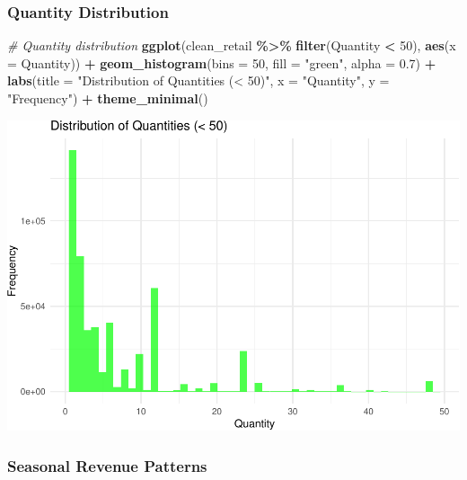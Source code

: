 \documentclass[
]{article}
\newenvironment{Shaded}{\begin{snugshade}}{\end{snugshade}}
\newcommand{\AttributeTok}[1]{\textcolor[rgb]{0.13,0.29,0.53}{#1}}
\newcommand{\CommentTok}[1]{\textcolor[rgb]{0.56,0.35,0.01}{\textit{#1}}}
\newcommand{\DecValTok}[1]{\textcolor[rgb]{0.00,0.00,0.81}{#1}}
\newcommand{\FloatTok}[1]{\textcolor[rgb]{0.00,0.00,0.81}{#1}}
\newcommand{\FunctionTok}[1]{\textcolor[rgb]{0.13,0.29,0.53}{\textbf{#1}}}
\newcommand{\NormalTok}[1]{#1}
\newcommand{\SpecialCharTok}[1]{\textcolor[rgb]{0.81,0.36,0.00}{\textbf{#1}}}
\newcommand{\StringTok}[1]{\textcolor[rgb]{0.31,0.60,0.02}{#1}}
\begin{document}
\subsubsection{Quantity Distribution}\label{quantity-distribution}

\begin{Shaded}
\begin{Highlighting}[]
\CommentTok{\# Quantity distribution}
\FunctionTok{ggplot}\NormalTok{(clean\_retail }\SpecialCharTok{\%\textgreater{}\%} \FunctionTok{filter}\NormalTok{(Quantity }\SpecialCharTok{\textless{}} \DecValTok{50}\NormalTok{), }\FunctionTok{aes}\NormalTok{(}\AttributeTok{x =}\NormalTok{ Quantity)) }\SpecialCharTok{+}
  \FunctionTok{geom\_histogram}\NormalTok{(}\AttributeTok{bins =} \DecValTok{50}\NormalTok{, }\AttributeTok{fill =} \StringTok{"green"}\NormalTok{, }\AttributeTok{alpha =} \FloatTok{0.7}\NormalTok{) }\SpecialCharTok{+}
  \FunctionTok{labs}\NormalTok{(}\AttributeTok{title =} \StringTok{"Distribution of Quantities (\textless{} 50)"}\NormalTok{, }
       \AttributeTok{x =} \StringTok{"Quantity"}\NormalTok{, }\AttributeTok{y =} \StringTok{"Frequency"}\NormalTok{) }\SpecialCharTok{+}
  \FunctionTok{theme\_minimal}\NormalTok{()}
\end{Highlighting}
\end{Shaded}

\includegraphics{capstone_customer_segmentation_files/figure-latex/exploratory-data-analysis12-1.pdf}

\subsubsection{Seasonal Revenue
Patterns}\label{seasonal-revenue-patterns}
\end{document}
